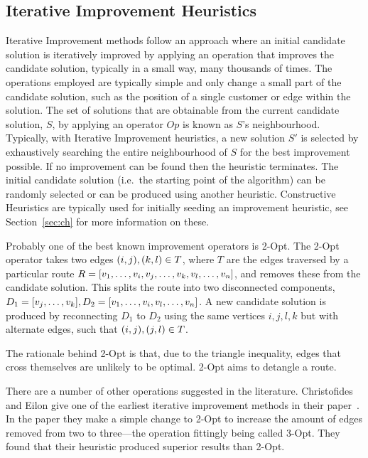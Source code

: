 \subsection{Iterative Improvement Heuristics}

Iterative Improvement methods follow an approach where an initial candidate solution is iteratively improved by applying an operation that improves the candidate solution, typically in a small way, many thousands of times. The operations employed are typically simple and only change a small part of the candidate solution, such as the position of a single customer or edge within the solution. The set of solutions that are obtainable from the current candidate solution, $S$, by applying an operator $Op$ is known as $S$'s neighbourhood. Typically, with Iterative Improvement heuristics, a new solution $S'$ is selected by exhaustively searching the entire neighbourhood of $S$ for the best improvement possible. If no improvement can be found then the heuristic terminates. The initial candidate solution (i.e.~the starting point of the algorithm) can be randomly selected or can be produced using another heuristic. Constructive Heuristics are typically used for initially seeding an improvement heuristic, see Section~\ref{sec:ch} for more information on these.
 
Probably one of the best known improvement operators is 2-Opt. The 2-Opt operator takes two edges $(i,j), (k,l) \in T$, where $T$ are the edges traversed by a particular route $R = [v_1,\ldots, v_i, v_j,\ldots,v_k, v_l,\ldots, v_n]$, and removes these from the candidate solution. This splits the route into two disconnected components, $D_1 = [v_j,\ldots, v_k], D_2 = [v_1,\ldots, v_i,v_l,\ldots, v_n]$. A new candidate solution is produced by reconnecting $D_1$ to $D_2$ using the same vertices $i,j,l,k$ but with alternate edges, such that $(i,j), (j,l) \in T$.


The rationale behind 2-Opt is that, due to the triangle inequality, edges that cross themselves are unlikely to be optimal. 2-Opt aims to detangle a route.

There are a number of other operations suggested in the literature. Christofides and Eilon give one of the earliest iterative improvement methods in their paper~\cite{CE:1969}. In the paper they make a simple change to 2-Opt to increase the amount of edges removed from two to three---the operation fittingly being called 3-Opt. They found that their heuristic produced superior results than 2-Opt.

